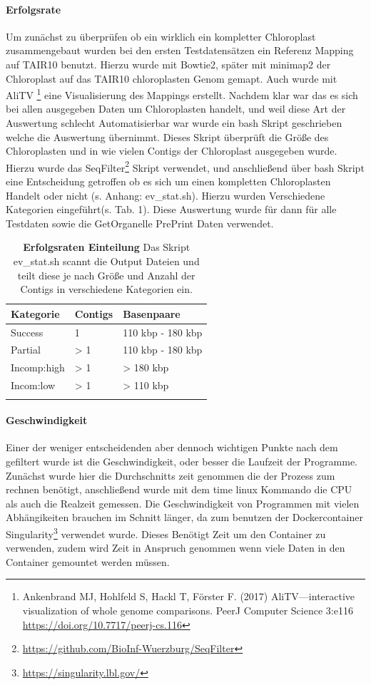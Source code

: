 \documentclass{scrartcl}
\begin{document}
\paragraph{Erfolgsrate}
\label{sec-3-1-2-2}
Um zunächst zu überprüfen ob ein wirklich ein kompletter Chloroplast zusammengebaut wurden bei den ersten Testdatensätzen ein Referenz Mapping auf
TAIR10 benutzt. Hierzu wurde mit Bowtie2, später mit minimap2 der Chloroplast auf das TAIR10 chloroplasten Genom gemapt. Auch wurde mit AliTV \footnote{Ankenbrand MJ, Hohlfeld S, Hackl T, Förster F. (2017) AliTV—interactive visualization of whole genome comparisons. PeerJ Computer Science 3:e116 \url{https://doi.org/10.7717/peerj-cs.116}} 
eine Visualisierung des Mappings erstellt. Nachdem klar war das es sich bei allen ausgegeben Daten um Chloroplasten handelt, und weil diese Art der 
Auswertung schlecht Automatisierbar war wurde ein bash Skript geschrieben welche die Auswertung übernimmt. Dieses Skript überprüft die Größe des
Chloroplasten und in wie vielen Contigs der Chloroplast ausgegeben wurde. Hierzu wurde das SeqFilter\footnote{\url{https://github.com/BioInf-Wuerzburg/SeqFilter}} Skript verwendet, und anschließend über bash
Skript eine Entscheidung getroffen ob es sich um einen kompletten Chloroplasten Handelt oder nicht (s. Anhang: ev\_stat.sh). Hierzu wurden Verschiedene
Kategorien eingeführt(s. Tab. 1). Diese Auswertung wurde für dann für alle Testdaten sowie die GetOrganelle PrePrint Daten verwendet.
\begin{table}[!h]
\caption[Erfolgsraten Einteilung]{\textbf{Erfolgsraten Einteilung} Das Skript ev\_stat.sh scannt die Output Dateien und teilt diese je nach Größe und Anzahl der Contigs in verschiedene Kategorien ein. }
\begin{center}
\begin{tabular}{lll}
Kategorie & Contigs & Basenpaare\\
\hline
Success & 1 & 110 kbp - 180 kbp\\
Partial & > 1 & 110 kbp - 180 kbp\\
Incomp:high & > 1 & > 180 kbp\\
Incom:low & > 1 & > 110 kbp\\
 &  & \\
\end{tabular}
\end{center}
\end{table}

\paragraph{Geschwindigkeit}
\label{sec-3-1-2-3}
Einer der weniger entscheidenden aber dennoch wichtigen Punkte nach dem gefiltert wurde ist die Geschwindigkeit, 
oder besser die Laufzeit der Programme. Zunächst wurde hier die Durchschnitts zeit genommen die der Prozess zum rechnen benötigt,
anschließend wurde mit dem time linux Kommando die CPU als auch die Realzeit gemessen. Die Geschwindigkeit von Programmen mit vielen Abhängikeiten 
brauchen im Schnitt länger, da zum benutzen der Dockercontainer Singularity\footnote{\url{https://singularity.lbl.gov/}} verwendet wurde. Dieses Benötigt Zeit um den Container zu verwenden,
zudem wird Zeit in Anspruch genommen wenn viele Daten in den Container gemountet werden müssen.
\end{document}
